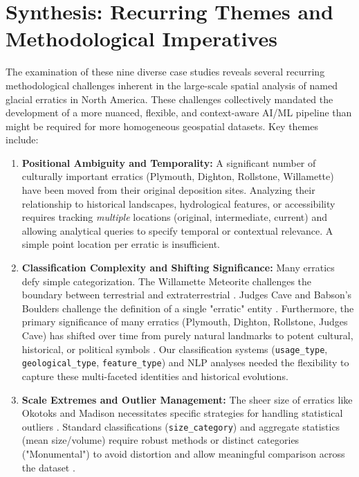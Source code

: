 \section{Synthesis: Recurring Themes and Methodological Imperatives}
\label{sec:synthesis}

The examination of these nine diverse case studies reveals several recurring methodological challenges inherent in the large-scale spatial analysis of named glacial erratics in North America. These challenges collectively mandated the development of a more nuanced, flexible, and context-aware AI/ML pipeline than might be required for more homogeneous geospatial datasets. Key themes include:

\begin{enumerate}
    \item \textbf{Positional Ambiguity and Temporality:} A significant number of culturally important erratics (Plymouth, Dighton, Rollstone, Willamette) have been moved from their original deposition sites. Analyzing their relationship to historical landscapes, hydrological features, or accessibility requires tracking \emph{multiple} locations (original, intermediate, current) and allowing analytical queries to specify temporal or contextual relevance. A simple point location per erratic is insufficient.
    \item \textbf{Classification Complexity and Shifting Significance:} Many erratics defy simple categorization. The Willamette Meteorite challenges the boundary between terrestrial and extraterrestrial \cite{AMNHWillamette, Pasek2008}. Judges Cave and Babson's Boulders challenge the definition of a single "erratic" entity \cite{Dana1891, Moore2005}. Furthermore, the primary significance of many erratics (Plymouth, Dighton, Rollstone, Judges Cave) has shifted over time from purely natural landmarks to potent cultural, historical, or political symbols \cite{Seelye1997, Lenik2009, googleLewistonEvening, Stiles1794}. Our classification systems (\texttt{usage\_type}, \texttt{geological\_type}, \texttt{feature\_type}) and NLP analyses needed the flexibility to capture these multi-faceted identities and historical evolutions.
    \item \textbf{Scale Extremes and Outlier Management:} The sheer size of erratics like Okotoks and Madison necessitates specific strategies for handling statistical outliers \cite{AlbertaOkotoks, NHMadisonBoulder}. Standard classifications (\texttt{size\_category}) and aggregate statistics (mean size/volume) require robust methods or distinct categories ("Monumental") to avoid distortion and allow meaningful comparison across the dataset \cite{Cuffey2010}.

\end{enumerate}
